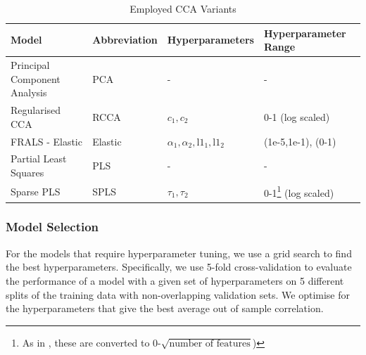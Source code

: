 \begin{table}[h]
    \centering
    \caption{Employed CCA Variants}
    \begin{tabular}{|l|l|l|l|}
        \hline
        \textbf{Model}               & \textbf{Abbreviation} & \textbf{Hyperparameters}                         & \textbf{Hyperparameter Range}                                                                                             \\
        \hline
        Principal Component Analysis & PCA                   & -                                                & -                                                                                                                         \\
        \hline
        Regularised CCA              & RCCA                  & \(c_1, c_2\)                                     & 0-1 (log scaled)                                                                                                          \\
        \hline
        FRALS - Elastic              & Elastic               & \(\alpha_1, \alpha_2, \text{l1}_1, \text{l1}_2\) & (1e-5,1e-1), (0-1)                                                                                                        \\
        \hline
        Partial Least Squares        & PLS                   & -                                                & -                                                                                                                         \\
        \hline
        Sparse PLS                   & SPLS                  & \(\tau_1, \tau_2\)                               & 0-1\footnote{As in \citet{witten2013package}, these are converted to 0-$\sqrt {\text{number of features}}$)} (log scaled) \\
        \hline
    \end{tabular}\label{tab:cca-variants}
\end{table}

\subsubsection{Model Selection}

For the models that require hyperparameter tuning, we use a grid search to find the best hyperparameters.
Specifically, we use 5-fold cross-validation to evaluate the performance of a model with a given set of hyperparameters on 5 different splits of the training data with non-overlapping validation sets.
We optimise for the hyperparameters that give the best average out of sample correlation.

